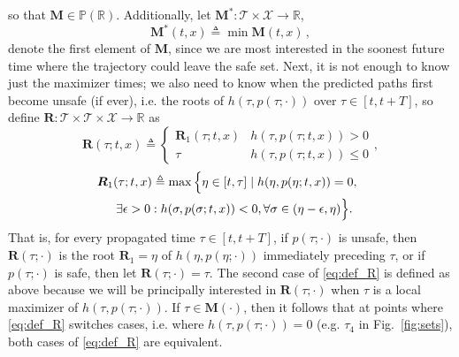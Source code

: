 \documentclass[10pt,conference]{ieeeconf}
\renewcommand{\(}{\left(}
\renewcommand{\)}{\right)}
\renewcommand{\[}{\left[}
\renewcommand{\]}{\right]}
\newcommand{\reals}{\mathbb{R}}
\begin{document}
so that $\boldsymbol{M} \in \mathbb{P}(\reals)$. Additionally, let $\boldsymbol{M}^*:\mathcal{T}\times\mathcal{X}\rightarrow\reals$, %
\begin{equation}
     \boldsymbol{M}^*(t,x) \triangleq \min \boldsymbol{M}(t,x) \,, \label{eq:def_M1star}
\end{equation}
denote the first element of $\boldsymbol{M}$, since we are most interested in the soonest future time where the trajectory could leave the safe set.
Next, it is not enough to know just the maximizer times; we also need to know when the predicted paths first become unsafe (if ever), {i.e. the roots of $h(\tau,p(\tau;\cdot))$ over $\tau\in[t,t+T]$,} so define $\boldsymbol{R}:\mathcal{T}\times\mathcal{T}\times\mathcal{X}\rightarrow \reals$ as
\begin{equation}
    \boldsymbol{R}(\tau;t,x) \triangleq \begin{cases} \boldsymbol{R}_1(\tau;t,x) & h(\tau,p(\tau;t,x)) > 0 \\ \tau & h(\tau,p(\tau;t,x)) \leq 0 \end{cases}, \label{eq:def_R}
\end{equation}
\vspace{-10pt}
\begin{multline}
    \hspace{-6pt}\boldsymbol{R}_1(\tau; t,x) \triangleq \max \Big\{ \eta \in [t, \tau] \mid h(\eta, p(\eta; t,x)) = 0, \\ %
    \hspace{-2pt} \exists \epsilon > 0 : h(\sigma, p(\sigma; t,x)) < 0, \forall \sigma \in (\eta-\epsilon, \eta) %
    \Big\}  . \hspace{-8pt} \label{eq:def_R1}
\end{multline}
That is, {for every propagated time $\tau\in[t,t+T]$}, {if $p(\tau;\cdot)$} is unsafe, then $\boldsymbol{R}(\tau; \cdot)$ is the root $\boldsymbol{R}_1=\eta$ of $h(\eta,p(\eta; \cdot))$ immediately preceding $\tau$, or if $p(\tau;\cdot)$ is safe, then 
{let}
$\boldsymbol{R}(\tau; \cdot) = \tau$.
{{The second case of \eqref{eq:def_R} is defined as above because we will be principally interested in $\boldsymbol{R}(\tau;\cdot)$ when $\tau$ is a local maximizer of $h(\tau,p(\tau;\cdot))$. If $\tau \in \boldsymbol{M}(\cdot)$, then it follows that at points where \eqref{eq:def_R} switches cases, i.e. where $h(\tau,p(\tau;\cdot))=0$ (e.g. $\tau_4$ in Fig.~\ref{fig:sets}), both cases of \eqref{eq:def_R} are equivalent. }}%
\end{document}
